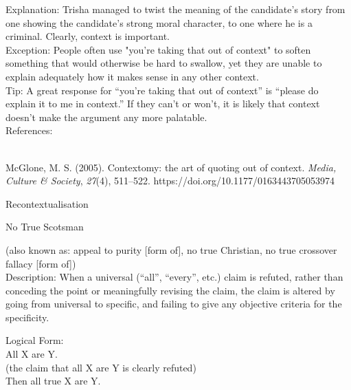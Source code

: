\documentclass[a4paper,12pt,single,pdftex]{scrartcl}
\begin{document}
    
      Explanation: Trisha managed to twist the meaning of the candidate's story from one showing the candidate's strong moral character, to one where he is a criminal. Clearly, context is important.
    \\

    
      Exception: People often use "you're taking that out of context" to soften something that would otherwise be hard to swallow, yet they are unable to explain adequately how it makes sense in any other context.
    \\

    
      Tip: A great response for “you’re taking that out of context” is “please do explain it to me in context.” If they can’t or won’t, it is likely that context doesn’t make the argument any more palatable.
    \\

    References:

    
      
        
      \\

      
        
          McGlone, M. S. (2005). Contextomy: the art of quoting out of context. {\it Media, Culture \& Society}, {\it 27}(4), 511–522. https://doi.org/10.1177/0163443705053974
        
      
    
  

Recontextualisation

No True Scotsman
    
      (also known as: appeal to purity [form of], no true Christian, no true crossover fallacy [form of])
    \\

  
    Description: When a universal (“all”, “every”, etc.) claim is refuted, rather than conceding the point or meaningfully revising the claim, the claim is altered by going from universal to specific, and failing to give any objective criteria for the specificity.

    
      Logical Form:
    \\

    
      All X are Y.
    \\

    
      (the claim that all X are Y is clearly refuted)
    \\

    
      Then all true X are Y.
    \\
\end{document}
